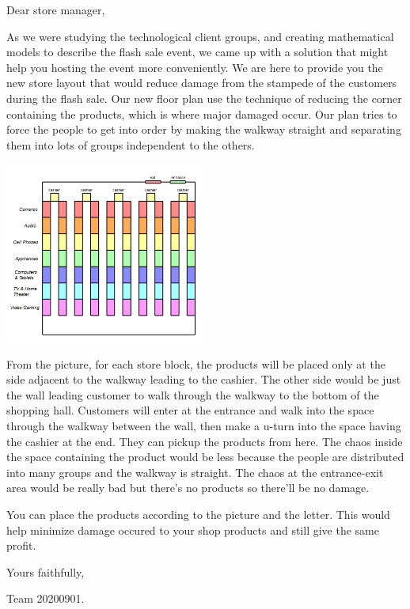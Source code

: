 Dear store manager, \newline

As we were studying the technological client groups, and creating mathematical models to describe the flash sale event, we came up with a solution that might help you hosting the event more conveniently.
We are here to provide you the new store layout that would reduce damage from the stampede of the customers during the flash sale. 
Our new floor plan use the technique of reducing the corner containing the products, which is where major damaged occur. Our plan tries to force the people to get into order by making the walkway straight and separating them into lots of groups independent to the others. 

\begin{center}
\includegraphics[width = 0.5\textwidth]{fig4.3.PNG}
\end{center}

From the picture, for each store block, the products will be placed only at the side adjacent to the walkway leading to the cashier. The other side would be just the wall leading customer to walk through the walkway to the bottom of the shopping hall.
Customers will enter at the entrance and walk into the space through the walkway between the wall, then make a u-turn into the space having the cashier at the end. They can pickup the products from here. 
The chaos inside the space containing the product would be less because the people are distributed into many groups and the walkway is straight.
The chaos at the entrance-exit area would be really bad but there's no products so there'll be no damage.
\newline

You can place the products according to the picture and the letter.
This would help minimize damage occured to your shop products and still give the same profit. 
\newline

Yours faithfully,\newline \par
Team 20200901.